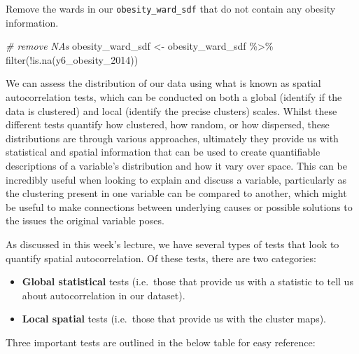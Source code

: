 \documentclass[
]{book}
\newenvironment{Shaded}{\begin{snugshade}}{\end{snugshade}}
\newcommand{\CommentTok}[1]{\textcolor[rgb]{0.56,0.35,0.01}{\textit{#1}}}
\newcommand{\FunctionTok}[1]{\textcolor[rgb]{0.00,0.00,0.00}{#1}}
\newcommand{\NormalTok}[1]{#1}
\newcommand{\OtherTok}[1]{\textcolor[rgb]{0.56,0.35,0.01}{#1}}
\newcommand{\SpecialCharTok}[1]{\textcolor[rgb]{0.00,0.00,0.00}{#1}}
\providecommand{\tightlist}{%
  \setlength{\itemsep}{0pt}\setlength{\parskip}{0pt}}
\begin{document}
Remove the wards in our \texttt{obesity\_ward\_sdf} that do not contain any obesity information.

\begin{Shaded}
\begin{Highlighting}[]
\CommentTok{\# remove NAs}
\NormalTok{obesity\_ward\_sdf }\OtherTok{\textless{}{-}}\NormalTok{ obesity\_ward\_sdf }\SpecialCharTok{\%\textgreater{}\%}
    \FunctionTok{filter}\NormalTok{(}\SpecialCharTok{!}\FunctionTok{is.na}\NormalTok{(y6\_obesity\_2014))}
\end{Highlighting}
\end{Shaded}

We can assess the distribution of our data using what is known as spatial autocorrelation tests, which can be conducted on both a global (identify if the data is clustered) and local (identify the precise clusters) scales. Whilst these different tests quantify how clustered, how random, or how dispersed, these distributions are through various approaches, ultimately they provide us with statistical and spatial information that can be used to create quantifiable descriptions of a variable's distribution and how it vary over space. This can be incredibly useful when looking to explain and discuss a variable, particularly as the clustering present in one variable can be compared to another, which might be useful to make connections between underlying causes or possible solutions to the issues the original variable poses.

As discussed in this week's lecture, we have several types of tests that look to quantify spatial autocorrelation. Of these tests, there are two categories:

\begin{itemize}
\tightlist
\item
  \textbf{Global statistical} tests (i.e.~those that provide us with a statistic to tell us about autocorrelation in our dataset).
\item
  \textbf{Local spatial} tests (i.e.~those that provide us with the cluster maps).
\end{itemize}

Three important tests are outlined in the below table for easy reference:
\end{document}
